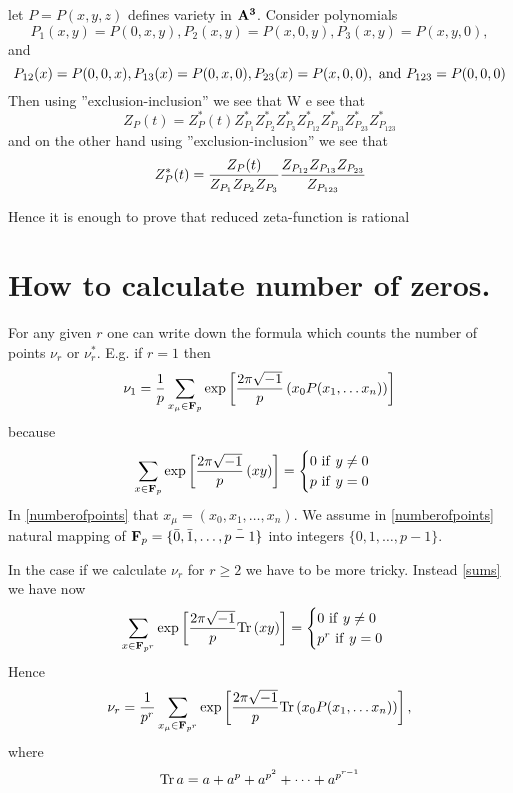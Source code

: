 \documentclass[12pt]{article}
\theoremstyle{theorem}
\numberwithin{equation}{section}
\begin{document}
 let $P=P(x,y,z)$ defines variety in $\bf A^3$. Consider polynomials
              $$
        P_1(x,y)=P(0,x,y), P_2(x,y)=P(x,0,y), P_3(x,y)=P(x,y,0),
              $$
and
             $$
          P_{12}(x)=P(0,0,x),P_{13}(x)=P(0,x,0),P_{23}(x)=P(x,0,0), \,\, {\rm and}\,\, P_{123}=P(0,0,0)
             $$
Then using ''exclusion-inclusion'' we see that
  W e see that
 \begin{equation}\label{expressionofusualzetaintermsofreduced}
    Z_P(t)=Z^*_P(t)Z^*_{P_1}Z^*_{P_2}Z^*_{P_3}Z^*_{P_{12}}Z^*_{P_{13}}Z^*_{P_{23}}Z^*_{P_{123}}
\end{equation}
and on the other hand using ''exclusion-inclusion'' we see that
 \begin{equation}\label{expressionofreducedintermsofusual}
    Z^*_P(t)={Z_P(t)\over Z_{P_1}Z_{P_2}Z_{P_3}}{Z_{P_{12}}Z_{P_{13}}Z_{P_{23}}\over Z_{P_{123}}}
\end{equation}

Hence it is enough to prove that reduced zeta-function is rational


\section{How to calculate number of zeros.}

  For any given $r$ one can write down the formula which counts the number of
   points  $\nu_r$ or $\nu_r^*$. E.g. if $r=1$ then
         \begin{equation}\label{numberofpoints}
    \nu_1={1\over p}\sum_{x_\mu\in {\bf F}_p}\exp\left[{2\pi \sqrt{-1}\over p}\left(x_0P(x_1,\dots x_n)\right)\right]
\end{equation}
  because
  \begin{equation}\label{sums}
 \sum_{x\in {\bf F}_p}\exp\left[{2\pi \sqrt{-1}\over p}\left(xy\right)\right]=
 \begin{cases}0 \,\,{\rm if}\,\,y\not=0\\ p \,\,{\rm if}\,\,y=0\end {cases}
\end{equation}
In \eqref{numberofpoints} that $x_\mu=(x_0,x_1,\dots,x_n)$. We assume in \eqref{numberofpoints}
natural mapping of ${\bf F}_p=\{\bar 0, \bar 1,\dots, \bar {p-1}\}$ into integers $\{ 0,  1,\dots,  {p-1}\}$.

In the case if we calculate $\nu_r$ for $r\geq 2$ we have to be more tricky.
Instead \eqref{sums} we have now
\begin{equation}\label{sumsextended}
 \sum_{x\in {\bf F}_{p^r}}\exp\left[{2\pi \sqrt{-1}\over p}{\rm Tr} \left(xy\right)\right]=
 \begin{cases}0 \,\,{\rm if}\,\,y\not=0\\ p^r \,\,{\rm if}\,\,y=0\end {cases}
\end{equation}
Hence
         \begin{equation}\label{numberofpointsforbigger r}
    \nu_r={1\over p^r}\sum_{x_\mu\in {\bf F}_{p^r}}\exp\left[{2\pi \sqrt{-1}\over p}{\rm Tr}
         \left(x_0P(x_1,\dots x_n)\right)\right],
                \end{equation}
 where
                        $$
                 {\rm Tr}\,a=a+a^p+a^{p^2}+\dots+a^{p^{r-1}}
                        $$
\end{document}
